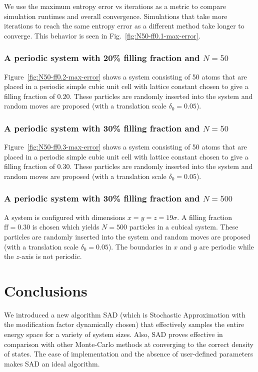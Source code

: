 \documentclass[letterpaper,twocolumn,amsmath,amssymb,pre,aps,10pt]{revtex4-1}
\begin{document}
We use the maximum entropy error vs iterations as a metric to compare
simulation runtimes and overall convergence.  Simulations that take
more iterations to reach the same entropy error as a different method
take longer to converge. This behavior is seen in
Fig.~\ref{fig:N50-ff0.1-max-error}.

\subsubsection{A periodic system with 20\% filling fraction and $N = 50$}

Figure~\ref{fig:N50-ff0.2-max-error} shows a system consisting of 50 atoms
that are placed in a periodic simple cubic unit cell with lattice constant
chosen to give a filling fraction of 0.20.  These particles are
randomly inserted into the system and random moves are proposed (with
a translation scale $\delta_0 = 0.05$).

\subsubsection{A periodic system with 30\% filling fraction and $N = 50$}

Figure~\ref{fig:N50-ff0.3-max-error} shows a system consisting of 50 atoms
that are placed in a periodic simple cubic unit cell with lattice constant
chosen to give a filling fraction of 0.30.  These particles are
randomly inserted into the system and random moves are proposed (with
a translation scale $\delta_0 = 0.05$).

\subsubsection{A periodic system with 30\% filling fraction and $N = 500$}

A system is configured with dimensions $x = y = z = 19\sigma$.  A
filling fraction $\text{ff} = 0.30$ is chosen which yields $N = 500$
particles in a cubical system.  These particles are randomly inserted
into the system and random moves are proposed (with a translation scale
$\delta_0 = 0.05$). The boundaries in $x$ and $y$ are periodic while
the $z$-axis is not periodic.

\section{Conclusions}

We introduced a new algorithm SAD (which is Stochastic Approximation
with the modification factor dynamically chosen) that effectively
samples the entire energy space for a variety of system sizes.  Also,
SAD proves effective in comparison with other Monte-Carlo methods at
converging to the correct density of states.  The ease of
implementation and the absence of user-defined parameters makes SAD an
ideal algorithm.
\end{document}
